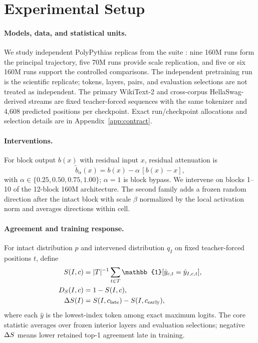 \section{Experimental Setup}
\label{sec:setup}

\paragraph{Models, data, and statistical units.}
We study independent PolyPythias replicas from the \model{} suite
\citep{biderman2023pythia}: nine 160M runs form the principal trajectory, five
70M runs provide scale replication, and five or six 160M runs support the
controlled comparisons. The independent pretraining run is the scientific
replicate; tokens, layers, pairs, and evaluation selections are not treated as
independent. The primary WikiText-2 and cross-corpus HellaSwag-derived streams
are fixed teacher-forced sequences with the same tokenizer and 4,608 predicted
positions per checkpoint. Exact run/checkpoint allocations and selection
details are in Appendix~\ref{app:contract}.

\paragraph{Interventions.}
For block output $b(x)$ with residual input $x$, residual attenuation is
\begin{equation}
  \tilde b_\alpha(x)=b(x)-\alpha\,[b(x)-x],
\end{equation}
with $\alpha\in\{0.25,0.50,0.75,1.00\}$; $\alpha=1$ is block bypass. We
intervene on blocks 1--10 of the 12-block 160M architecture. The second family
adds a frozen random direction after the intact block with scale $\beta$
normalized by the local activation norm and averages directions within cell.

\paragraph{Agreement and training response.}
For intact distribution $p$ and intervened distribution $q_I$ on fixed
teacher-forced positions $t$, define
\begin{align}
 S(I,c) &= |T|^{-1}\sum_{t\in T}\mathbb{1}[\hat y_{c,t}=\hat y_{I,c,t}],\\
 D_S(I,c)&=1-S(I,c),\\
 \deltas(I)&=S(I,c_{\rm late})-S(I,c_{\rm early}),
\end{align}
where each $\hat y$ is the lowest-index token among exact maximum logits. The
core statistic averages over frozen interior layers and evaluation selections;
negative $\Delta S$ means lower retained top-1 agreement late in training.

